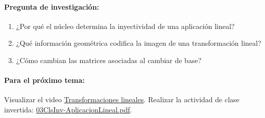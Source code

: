 \documentclass[a4,11pt]{aleph-notas}
\begin{document}
\paragraph{Pregunta de investigación:}
\begin{enumerate}[leftmargin=*]
    \item ¿Por qué el núcleo determina la inyectividad de una aplicación lineal?
    \item ¿Qué información geométrica codifica la imagen de una transformación lineal?
    \item ¿Cómo cambian las matrices asociadas al cambiar de base?
\end{enumerate}

\paragraph{Para el próximo tema:}  
Visualizar el video \href{https://youtu.be/YJfS4_m_0Z8?si=kFS74G3kXhWGWq4L}{Transformaciones lineales}.
Realizar la actividad de clase invertida: \href{https://fcena-puce.github.io/AlgebraLineal-05-N0048/07Act-ClaseInvertida/03ClsInv-AplicacionLineal.pdf}{03ClsInv-AplicacionLineal.pdf}.
\end{document}
